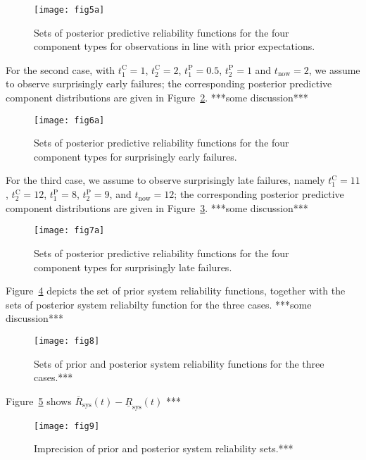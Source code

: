 \documentclass[Journal,SectionNumbers,SingleSpace,InsideFigs]{ascelike}
\newcommand{\ul}[1]{\underline{#1}}
\newcommand{\ol}[1]{\overline{#1}}
\newcommand{\lRsys}{\ul{R}_\text{sys}}
\newcommand{\uRsys}{\ol{R}_\text{sys}}
\def\tnow{t_\text{now}}
\begin{document}
\begin{figure}
\texttt{[image: fig5a]}
\caption{Sets of posterior predictive reliability functions for the four component types
for observations in line with prior expectations.}
\label{fig:comppost-1}
\end{figure}

For the second case, with $t_1^\text{C} = 1$, $t_2^\text{C} = 2$, $t_1^\text{P} = 0.5$, $t_2^\text{P} = 1$
and $\tnow = 2$, we assume to observe surprisingly early failures;
the corresponding posterior predictive component distributions are given in Figure~\ref{fig:comppost-2}.
***some discussion***

\begin{figure}
\texttt{[image: fig6a]}
\caption{Sets of posterior predictive reliability functions for the four component types
for surprisingly early failures.}
\label{fig:comppost-2}
\end{figure}

For the third case, we assume to observe surprisingly late failures,
namely $t_1^\text{C} = 11$, $t_2^\text{C} = 12$, $t_1^\text{P} = 8$, $t_2^\text{P} = 9$, and $\tnow = 12$;
the corresponding posterior predictive component distributions are given in Figure~\ref{fig:comppost-3}.
***some discussion***

\begin{figure}
\texttt{[image: fig7a]}
\caption{Sets of posterior predictive reliability functions for the four component types
for surprisingly late failures.}
\label{fig:comppost-3}
\end{figure}

Figure~\ref{fig:brake-sysrels} depicts the set of prior system reliability functions,
together with the sets of posterior system reliabilty function for the three cases.
***some discussion***

\begin{figure}
\texttt{[image: fig8]}
\caption{Sets of prior and posterior system reliability functions for the three cases.*** }
\label{fig:brake-sysrels}
\end{figure}

Figure~\ref{fig:brake-sysrels-imprecision} shows $\uRsys(t) - \lRsys(t)$ ***

\begin{figure}
\centering
\texttt{[image: fig9]}
\caption{Imprecision of prior and posterior system reliability sets.*** }
\label{fig:brake-sysrels-imprecision}
\end{figure}
\end{document}

